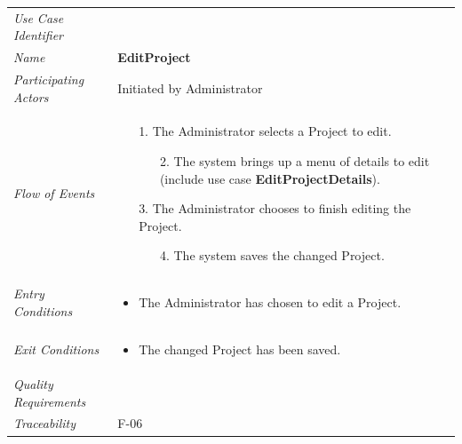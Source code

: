 \documentclass[12pt,letterpaper]{article}
\begin{document}
\begin{center}
	\begin{tabu} to 
		\toprule
		Use Case Identifier & \editproject{} \\
		Name & {\bf EditProject} \\
		Participating Actors & Initiated by Administrator \\
		Flow of Events & 
		\begin{minipage}[t]{\linewidth}
		    \begin{enumerate}
			    \item[1.] The Administrator selects a Project to edit.
			    \begin{enumerate}
			        \item[2.] The system brings up a menu of details to edit (include use case \textbf{EditProjectDetails}).
			    \end{enumerate}
			    \item[3.] The Administrator chooses to finish editing the Project.
			    \begin{enumerate}
			        \item[4.] The system saves the changed Project.
			    \end{enumerate}
			\end{enumerate}
		\end{minipage} \\

		Entry Conditions &
		\begin{minipage}[t]{\linewidth}
			\begin{itemize}
			    \item The Administrator has chosen to edit a Project.
	        \end{itemize}
		\end{minipage} \\

		Exit Conditions &
		\begin{minipage}[t]{\linewidth}
			\begin{itemize}
			    \item The changed Project has been saved.
	        \end{itemize}
		\end{minipage} \\

		Quality Requirements & \\

		Traceability & F-06 \\
		\toprule
	\end{tabu}
\end{center}
\end{document}

